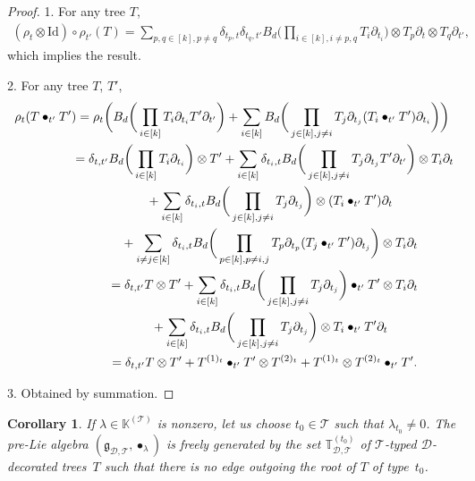\documentclass[pdftex]{sigma}
\numberwithin{equation}{section}
\newtheorem{Corollary}[Theorem]{Corollary}
\newcommand{\K}{\mathbb{K}}
\newcommand{\T}{\mathcal{T}}
\newcommand{\D}{\mathcal{D}}
\newcommand{\g}{\mathfrak{g}}
\newcommand{\bfT}{\mathbb{T}}
\newcommand{\id}{\mathrm{Id}}
\begin{document}
\begin{proof} 1. For any tree $T$,
\begin{gather*}
(\rho_t\otimes \id)\circ \rho_{t'}(T)=\sum_{p,q\in [k], p\neq q}
\delta_{t_p,t}\delta_{t_q,t'} B_d\bigg(\prod_{i\in [k], i\neq p,q}T_i\partial_{t_i}
\bigg)\otimes T_p \partial_t \otimes T_q\partial_{t'},
\end{gather*}
which implies the result.

2. For any tree $T$, $T'$,
\begin{gather*}
\rho_t(T\bullet_{t'} T')=\rho_t\bigg(B_d\bigg(\prod_{i\in [k]}T_i\partial_{t_i} T'\partial_{t'}\bigg)
+\sum_{i\in [k]} B_d\bigg(\prod_{j\in [k], j\neq i}T_j \partial_{t_j} (T_i\bullet_{t'}T')\partial_{t_i}\bigg)\bigg)
\\ \hphantom{\rho_t(T\bullet_{t'} T')}
{}=\delta_{t,t'}B_d\bigg(\prod_{i\in [k]}T_i\partial_{t_i}\bigg)\otimes T'+\sum_{i\in [k]} \delta_{t_i,t}
B_d\bigg(\prod_{j\in [k],j\neq i}T_j\partial_{t_j} T'\partial_{t'}\bigg)\otimes T_i\partial_t
\\ \hphantom{\rho_t(T\bullet_{t'} T')=}
{}+\sum_{i\in [k]}\delta_{t_i,t}B_d\bigg(\prod_{j\in [k], j\neq i}T_j \partial_{t_j} \bigg)\otimes (T_i\bullet_{t'}T')\partial_t
\\ \hphantom{\rho_t(T\bullet_{t'} T')=}
{}+\sum_{i\neq j \in [k]}\delta_{t_i,t}
B_d\bigg(\prod_{p\in [k],p\neq i,j} T_p \partial_{t_p} (T_j\bullet_{t'} T')\partial_{t_j}\bigg)\otimes T_i \partial_t
\\ \hphantom{\rho_t(T\bullet_{t'} T')}
{}=\delta_{t,t'}T\otimes T'+\sum_{i\in [k]} \delta_{t_i,t}
B_d\bigg(\prod_{j\in [k],j\neq i}T_j\partial_{t_j}\bigg)\bullet_{t'} T'\otimes T_i \partial_t
\\ \hphantom{\rho_t(T\bullet_{t'} T')=}
{}+\sum_{i\in [k]} \delta_{t_i,t}B_d\bigg(\prod_{j\in [k],j\neq i}T_j\partial_{t_j}\bigg)\otimes T_i \bullet_{t'} T'\partial_t
\\ \hphantom{\rho_t(T\bullet_{t'} T')}
{}=\delta_{t,t'}T\otimes T'+T^{(1)_t}\bullet_{t'}T'\otimes T^{(2)_t}+T^{(1)_t}\otimes T^{(2)_t}\bullet_{t'}T'.
\end{gather*}

3. Obtained by summation. \end{proof}

\begin{Corollary} \label{cor15}
If $\lambda \in \K^{(\T)}$ is nonzero, let us choose $t_0\in \T$ such that $\lambda_{t_0}\neq 0$.
The pre-Lie algebra $(\g_{\D,\T}, \bullet_\lambda)$ is freely generated by the set
$\bfT_{\D,\T}^{(t_0)}$ of $\T$-typed $\D$-decorated trees~$T$ such that
there is no edge outgoing the root of $T$ of type~$t_0$.
\end{Corollary}
\end{document}
